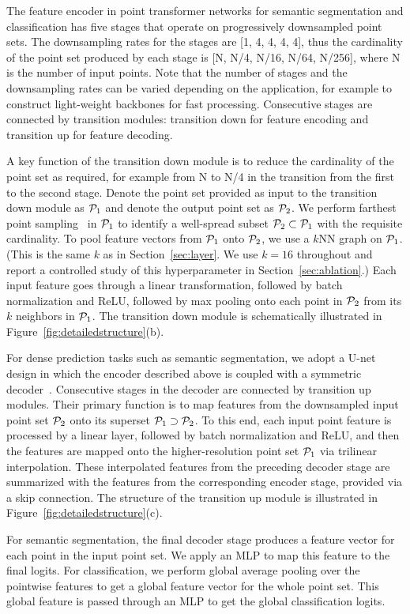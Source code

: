 The feature encoder in point transformer networks for semantic segmentation and classification has five stages that operate on progressively downsampled point sets. The downsampling rates for the stages are [1, 4, 4, 4, 4], thus the cardinality of the point set produced by each stage is [N, N/4, N/16, N/64, N/256], where N is the number of input points. Note that the number of stages and the downsampling rates can be varied depending on the application, for example to construct light-weight backbones for fast processing. Consecutive stages are connected by transition modules: transition down for feature encoding and transition up for feature decoding.

A key function of the transition down module is to reduce the cardinality of the point set as required, for example from N to N/4 in the transition from the first to the second stage. Denote the point set provided as input to the transition down module as $\mathcal{P}_1$ and denote the output point set as $\mathcal{P}_2$. We perform farthest point sampling~\cite{qi2017pointnet2} in $\mathcal{P}_1$ to identify a well-spread subset $\mathcal{P}_2 \subset \mathcal{P}_1$ with the requisite cardinality. To pool feature vectors from $\mathcal{P}_1$ onto $\mathcal{P}_2$, we use a $k$NN graph on $\mathcal{P}_1$. (This is the same $k$ as in Section~\ref{sec:layer}. We use $k=16$ throughout and report a controlled study of this hyperparameter in Section~\ref{sec:ablation}.) Each input feature goes through a linear transformation, followed by batch normalization and ReLU, followed by max pooling onto each point in $\mathcal{P}_2$ from its $k$ neighbors in $\mathcal{P}_1$. The transition down module is schematically illustrated in Figure~\ref{fig:detailedstructure}(b).

For dense prediction tasks such as semantic segmentation, we adopt a U-net design in which the encoder described above is coupled with a symmetric decoder~\cite{qi2017pointnet2,choy20194d}. Consecutive stages in the decoder are connected by transition up modules. Their primary function is to map features from the downsampled input point set $\mathcal{P}_2$ onto its superset $\mathcal{P}_1 \supset \mathcal{P}_2$.
To this end, each input point feature is processed by a linear layer, followed by batch normalization and ReLU, and then the features are mapped onto the higher-resolution point set $\mathcal{P}_1$ via trilinear interpolation.
These interpolated features from the preceding decoder stage are summarized with the features from the corresponding encoder stage, provided via a skip connection.
The structure of the transition up module is illustrated in Figure~\ref{fig:detailedstructure}(c).

For semantic segmentation, the final decoder stage produces a feature vector for each point in the input point set. We apply an MLP to map this feature to the final logits. For classification, we perform global average pooling over the pointwise features to get a global feature vector for the whole point set. This global feature is passed through an MLP to get the global classification logits.